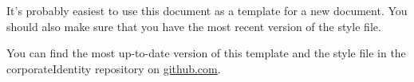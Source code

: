 It's probably easiest to use this document as a template for a new document. You should also make sure that you have the most recent version of the style file.

You can find the most up-to-date version of this template and the style file in the corporateIdentity repository on \href{https://github.com/AndyClifton/CorporateLatex}{github.com}.
